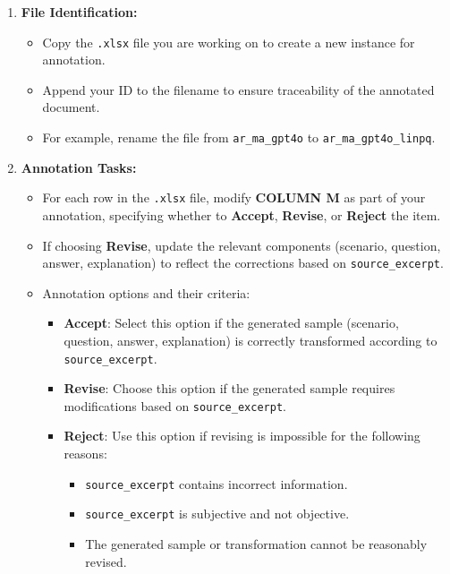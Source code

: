 \documentclass[11pt]{article}
\begin{document}
\begin{enumerate}
    \item \textbf{File Identification:}
    \begin{itemize}
        \item Copy the \texttt{.xlsx} file you are working on to create a new instance for annotation.
        \item Append your ID to the filename to ensure traceability of the annotated document.
        \item For example, rename the file from \texttt{ar\_ma\_gpt4o} to \texttt{ar\_ma\_gpt4o\_linpq}.
    \end{itemize}
    
    \item \textbf{Annotation Tasks:}
    \begin{itemize}
        \item For each row in the \texttt{.xlsx} file, modify \textbf{COLUMN M} as part of your annotation, specifying whether to \textbf{Accept}, \textbf{Revise}, or \textbf{Reject} the item.
        \item If choosing \textbf{Revise}, update the relevant components (scenario, question, answer, explanation) to reflect the corrections based on \texttt{source\_excerpt}.
        \item Annotation options and their criteria:
        \begin{itemize}
            \item \textbf{Accept}: Select this option if the generated sample (scenario, question, answer, explanation) is correctly transformed according to \texttt{source\_excerpt}.
            \item \textbf{Revise}: Choose this option if the generated sample requires modifications based on \texttt{source\_excerpt}.
            \item \textbf{Reject}: Use this option if revising is impossible for the following reasons:
            \begin{itemize}
                \item \texttt{source\_excerpt} contains incorrect information.
                \item \texttt{source\_excerpt} is subjective and not objective.
                \item The generated sample or transformation cannot be reasonably revised.
            \end{itemize}
        \end{itemize}
    \end{itemize}
\end{enumerate}
\end{document}

